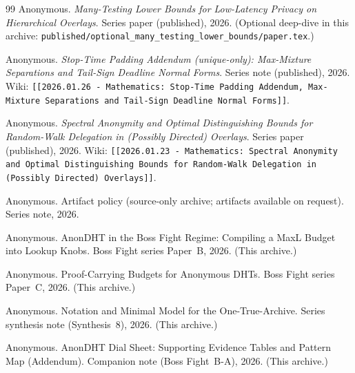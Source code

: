 \documentclass[11pt]{article}
\begin{document}
\begin{thebibliography}{99}
Anonymous.
\newblock \emph{Many-Testing Lower Bounds for Low-Latency Privacy on Hierarchical Overlays}.
\newblock Series paper (published), 2026. (Optional deep-dive in this archive: \texttt{published/optional\_many\_testing\_lower\_bounds/paper.tex}.)


Anonymous.
\newblock \emph{Stop-Time Padding Addendum (unique-only): Max-Mixture Separations and Tail-Sign Deadline Normal Forms}.
\newblock Series note (published), 2026.
\newblock Wiki: \texttt{[[2026.01.26 - Mathematics: Stop-Time Padding Addendum, Max-Mixture Separations and Tail-Sign Deadline Normal Forms]]}.


Anonymous.
\newblock \emph{Spectral Anonymity and Optimal Distinguishing Bounds for Random-Walk Delegation in (Possibly Directed) Overlays}.
\newblock Series paper (published), 2026.
\newblock Wiki: \texttt{[[2026.01.23 - Mathematics: Spectral Anonymity and Optimal Distinguishing Bounds for Random-Walk Delegation in (Possibly Directed) Overlays]]}.


Anonymous.
\newblock Artifact policy (source-only archive; artifacts available on request).
\newblock Series note, 2026.

Anonymous.
\newblock AnonDHT in the Boss Fight Regime: Compiling a MaxL Budget into Lookup Knobs.
\newblock Boss Fight series Paper~B, 2026. (This archive.)

Anonymous.
\newblock Proof-Carrying Budgets for Anonymous DHTs.
\newblock Boss Fight series Paper~C, 2026. (This archive.)

Anonymous.
\newblock Notation and Minimal Model for the One-True-Archive.
\newblock Series synthesis note (Synthesis~8), 2026. (This archive.)




Anonymous.
\newblock AnonDHT Dial Sheet: Supporting Evidence Tables and Pattern Map (Addendum).
\newblock Companion note (Boss Fight~B-A), 2026. (This archive.)

\end{thebibliography}
\end{document}
